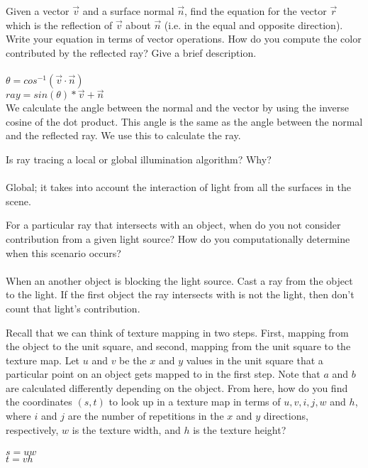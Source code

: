 \documentclass[10pt,twocolumn]{article}
\begin{document}
\begin{framed}
\noindent{\bf[2 points]} Given a vector $\vec{v}$ and a surface normal $\vec{n}$, find the equation for the vector $\vec{r}$ which is the reflection of $\vec{v}$ about $\vec{n}$ (i.e. in the equal and opposite direction). Write your equation in terms of vector operations. How do you compute the color contributed by the reflected ray? Give a brief description.\\\\
$\theta = cos^{-1}(\vec{v} \cdot \vec{n})$\\
$ray = sin(\theta) * \vec{v} + \vec{n}$\\

We calculate the angle between the normal and the vector by using the inverse cosine of the dot product. This angle is the same as the angle between the normal and the reflected ray. We use this to calculate the ray.

\end{framed}

\begin{framed}
\noindent{\bf[1 point]} Is ray tracing a local or global illumination algorithm? Why?\\\\
Global; it takes into account the interaction of light from all the surfaces in the scene.

\end{framed}

\begin{framed}
\noindent{\bf[1 point]} For a particular ray that intersects with an object, when do you not consider contribution from a given light source? How do you computationally determine when this scenario occurs?\\\\
When an another object is blocking the light source. Cast a ray from the object to the light. If the first object the ray intersects with is not the light, then don't count that light's contribution.
\end{framed}

\begin{framed}
\noindent{\bf[2 points]} Recall that we can think of texture mapping in two steps. First, mapping from the object to the unit square, and second, mapping from the unit square to the texture map. Let $u$ and $v$ be the $x$ and $y$ values in the unit square that a particular point on an object gets mapped to in the first step. Note that $a$ and $b$ are calculated differently depending on the object. From here, how do you find the coordinates $(s, t)$ to look up in a texture map in terms of $u, v, i, j, w$ and $h$, where $i$ and $j$ are the number of repetitions in the $x$ and $y$
directions, respectively, $w$ is the texture width, and $h$ is the texture height?\\\\
$s = uw$\\
$t = vh$\\

\end{framed}
\end{document}
